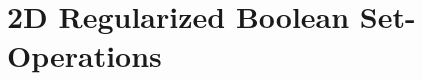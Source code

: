 
\ccParDims

\chapter{2D Regularized Boolean Set-Operations}


\begingroup

\label{chapter_Boolean_set_operations_2}

\lcTex{%
  \newlength{\BooleanSetOpsWidthExtra}\setlength{\BooleanSetOpsWidthExtra}{1.1cm}
  \newlength{\BooleanSetOpsWidthLineReal}\setlength{\BooleanSetOpsWidthLineReal}{\linewidth}
  \addtolength{\BooleanSetOpsWidthLineReal}{-\BooleanSetOpsWidthExtra}
  \newlength{\BooleanSetOpsMinipageSpace}\setlength{\BooleanSetOpsMinipageSpace}{0.2cm}

  \newlength{\BooleanSetOpsWidthLeft}
  \newlength{\BooleanSetOpsWidthRight}
}

\newcommand{\calC}{{\cal C}}
\newcommand{\calA}{{\cal A}}
\newcommand{\eps}{{\varepsilon}}
\newcommand{\dcel}{{\sc Dcel}}
\newcommand{\naive}{na\"{\i}ve}
\newcommand{\kdtree}{{\sc Kd}-tree}





\endgroup
